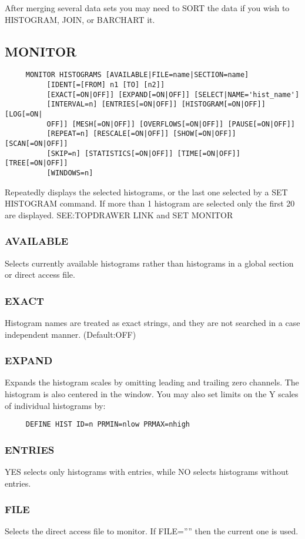 After merging several data sets you may need to SORT the data if you wish
to HISTOGRAM, JOIN, or BARCHART it.  
\subsection{MONITOR}
\begin{verbatim}
     MONITOR HISTOGRAMS [AVAILABLE|FILE=name|SECTION=name]
          [IDENT[=[FROM] n1 [TO] [n2]] 
          [EXACT[=ON|OFF]] [EXPAND[=ON|OFF]] [SELECT|NAME='hist_name']
          [INTERVAL=n] [ENTRIES[=ON|OFF]] [HISTOGRAM[=ON|OFF]] [LOG[=ON|
          OFF]] [MESH[=ON|OFF]] [OVERFLOWS[=ON|OFF]] [PAUSE[=ON|OFF]]
          [REPEAT=n] [RESCALE[=ON|OFF]] [SHOW[=ON|OFF]] [SCAN[=ON|OFF]]
          [SKIP=n] [STATISTICS[=ON|OFF]] [TIME[=ON|OFF]] [TREE[=ON|OFF]]
          [WINDOWS=n] 
\end{verbatim}
Repeatedly displays the selected histograms, or the last one selected by
a SET HISTOGRAM command.  If more than 1 histogram are selected only the
first 20 are displayed.  SEE:TOPDRAWER LINK and SET MONITOR 
\subsubsection{AVAILABLE}
Selects currently available histograms rather than histograms in a
global section or direct access file.  
\subsubsection{EXACT}
Histogram names are treated as exact strings, and they are not searched
in a case independent manner.  
(Default:OFF) 
\subsubsection{EXPAND}
Expands the histogram scales by omitting leading and trailing zero
channels.  The histogram is also centered in the window.  You may also
set limits on the Y scales of individual histograms by:  
\begin{verbatim}
     DEFINE HIST ID=n PRMIN=nlow PRMAX=nhigh 
\end{verbatim}
\subsubsection{ENTRIES}
YES selects only histograms with entries, while NO selects histograms
without entries.  
\subsubsection{FILE}
Selects the direct access file to monitor.  If FILE='''' then the current
one is used.  
